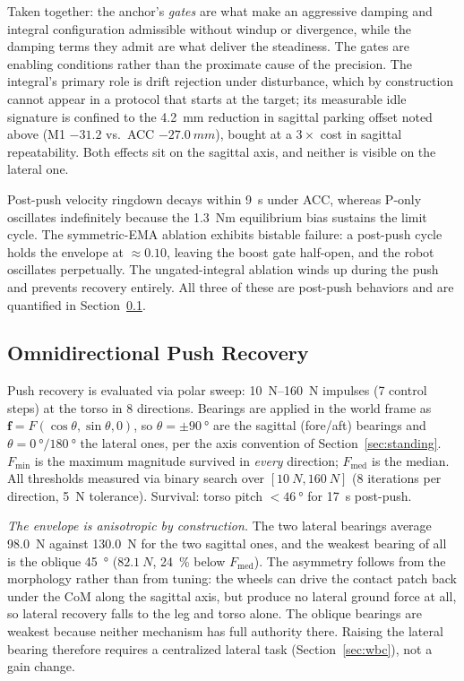\documentclass[a4paper,fleqn]{cas-dc}
\begin{document}
Taken together: the anchor's \emph{gates} are what make an aggressive damping and
integral configuration admissible without windup or divergence, while the damping
terms they admit are what deliver the steadiness. The gates are enabling
conditions rather than the proximate cause of the precision. The integral's primary role is drift rejection
under disturbance, which by construction cannot appear in a protocol that starts
at the target; its measurable idle signature is confined to the \SI{4.2}{mm}
reduction in sagittal parking offset noted above (M1 $-31.2$ vs.\ ACC
$\SI{-27.0}{mm}$), bought at a $3{\times}$ cost in sagittal repeatability. Both
effects sit on the sagittal axis, and neither is visible on the lateral one.

Post-push velocity ringdown decays within \SI{9}{s} under ACC, whereas P-only
oscillates indefinitely because the \SI{1.3}{Nm} equilibrium bias sustains the limit
cycle. The symmetric-EMA ablation exhibits bistable failure: a post-push cycle holds
the envelope at ${\approx}0.10$, leaving the boost gate half-open, and the robot
oscillates perpetually. The ungated-integral ablation winds up during the push and
prevents recovery entirely. All three of these are post-push behaviors and are
quantified in Section~\ref{sec:push}.

\subsection{Omnidirectional Push Recovery}
\label{sec:push}

Push recovery is evaluated via polar sweep: \SIrange{10}{160}{N} impulses (\num{7} control steps) at the torso in \num{8} directions.
Bearings are applied in the world frame as $\mathbf{f}=F(\cos\theta,\sin\theta,0)$, so $\theta{=}\pm\SI{90}{\degree}$ are the sagittal (fore/aft) bearings and $\theta{=}\SI{0}{\degree}/\SI{180}{\degree}$ the lateral ones, per the axis convention of Section~\ref{sec:standing}.
$F_{\min}$ is the maximum magnitude survived in \emph{every} direction; $F_{\text{med}}$ is the median.
All thresholds measured via binary search over $[\SI{10}{N},\SI{160}{N}]$ (\num{8} iterations per direction, \SI{5}{N} tolerance).
Survival: torso pitch $<\SI{46}{\degree}$ for \SI{17}{s} post-push.

\emph{The envelope is anisotropic by construction.} The two lateral bearings average \SI{98.0}{N} against \SI{130.0}{N} for the two sagittal ones, and the weakest bearing of all is the oblique \SI{45}{\degree} ($\SI{82.1}{N}$, \SI{24}{\percent} below $F_{\text{med}}$). The asymmetry follows from the morphology rather than from tuning: the wheels can drive the contact patch back under the CoM along the sagittal axis, but produce no lateral ground force at all, so lateral recovery falls to the leg and torso alone. The oblique bearings are weakest because neither mechanism has full authority there. Raising the lateral bearing therefore requires a centralized lateral task (Section~\ref{sec:wbc}), not a gain change.
\end{document}
